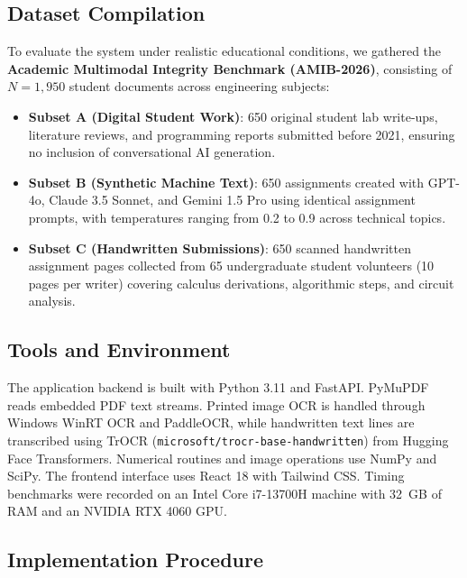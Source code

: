 \documentclass[conference]{IEEEtran}
\begin{document}
\subsection{Dataset Compilation}
To evaluate the system under realistic educational conditions, we gathered the \textbf{Academic Multimodal Integrity Benchmark (AMIB-2026)}, consisting of $N = 1,950$ student documents across engineering subjects:
\begin{itemize}
    \item \textbf{Subset A (Digital Student Work)}: 650 original student lab write-ups, literature reviews, and programming reports submitted before 2021, ensuring no inclusion of conversational AI generation.
    \item \textbf{Subset B (Synthetic Machine Text)}: 650 assignments created with GPT-4o, Claude 3.5 Sonnet, and Gemini 1.5 Pro using identical assignment prompts, with temperatures ranging from 0.2 to 0.9 across technical topics.
    \item \textbf{Subset C (Handwritten Submissions)}: 650 scanned handwritten assignment pages collected from 65 undergraduate student volunteers (10 pages per writer) covering calculus derivations, algorithmic steps, and circuit analysis.
\end{itemize}

\subsection{Tools and Environment}
The application backend is built with Python 3.11 and FastAPI. PyMuPDF reads embedded PDF text streams. Printed image OCR is handled through Windows WinRT OCR and PaddleOCR, while handwritten text lines are transcribed using TrOCR (\texttt{microsoft/trocr-base-handwritten}) from Hugging Face Transformers. Numerical routines and image operations use NumPy and SciPy. The frontend interface uses React 18 with Tailwind CSS. Timing benchmarks were recorded on an Intel Core i7-13700H machine with 32~GB of RAM and an NVIDIA RTX 4060 GPU.

\subsection{Implementation Procedure}
\end{document}

